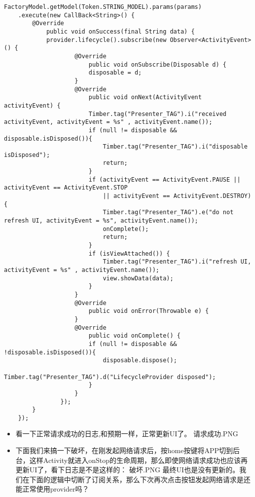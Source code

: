 \documentclass[9pt, b5paper]{article}
\begin{document}
\begin{verbatim}
FactoryModel.getModel(Token.STRING_MODEL).params(params)
    .execute(new CallBack<String>() {
        @Override
            public void onSuccess(final String data) {
            provider.lifecycle().subscribe(new Observer<ActivityEvent>() {
                    @Override
                        public void onSubscribe(Disposable d) {
                        disposable = d;
                    }
                    @Override
                        public void onNext(ActivityEvent activityEvent) {
                        Timber.tag("Presenter_TAG").i("received activityEvent, activityEvent = %s" , activityEvent.name());
                        if (null != disposable && disposable.isDisposed()){
                            Timber.tag("Presenter_TAG").i("disposable isDisposed");
                            return;
                        }
                        if (activityEvent == ActivityEvent.PAUSE || activityEvent == ActivityEvent.STOP
                            || activityEvent == ActivityEvent.DESTROY) {
                            Timber.tag("Presenter_TAG").e("do not refresh UI, activityEvent = %s", activityEvent.name());
                            onComplete();
                            return;
                        }
                        if (isViewAttached()) {
                            Timber.tag("Presenter_TAG").i("refresh UI, activityEvent = %s" , activityEvent.name());
                            view.showData(data);
                        }
                    }
                    @Override
                        public void onError(Throwable e) {
                    }
                    @Override
                        public void onComplete() {
                        if (null != disposable && !disposable.isDisposed()){
                            disposable.dispose();
                            Timber.tag("Presenter_TAG").d("LifecycleProvider disposed");
                        }
                    }
                });
        }
    });
\end{verbatim}
\begin{itemize}
\item 看一下正常请求成功的日志,和预期一样，正常更新UI了。   请求成功.PNG
\item 下面我们来搞一下破坏，在刚发起网络请求后，按home按键将APP切到后台，这样Activity就进入onStop的生命周期，那么即使网络请求成功也应该再更新UI了，看下日志是不是这样的：   破坏.PNG  最终UI也是没有更新的。我们在下面的逻辑中切断了订阅关系，那么下次再次点击按钮发起网络请求是还能正常使用provider吗？
\end{itemize}
\end{document}
